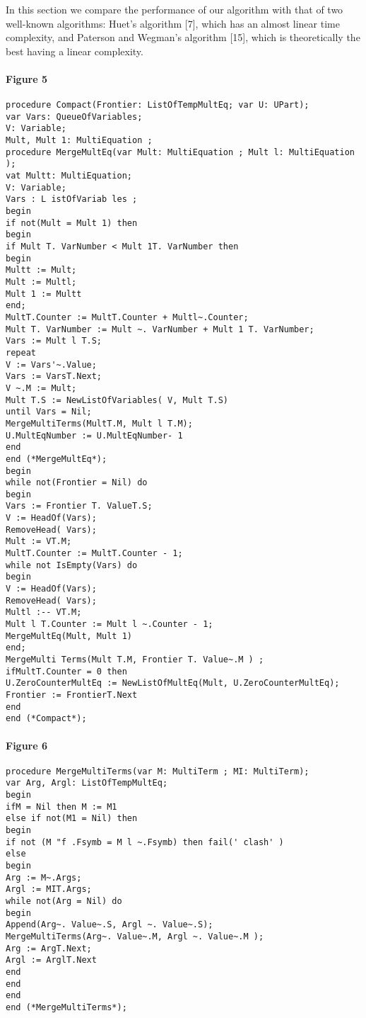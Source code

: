 \label{mmalg7}

In this section we compare the performance of our algorithm with that of two
well-known algorithms: Huet's algorithm [7], which has an almost linear time
complexity, and Paterson and Wegman's algorithm [15], which is theoretically
the best having a linear complexity.

\paragraph{Figure 5}
\begin{verbatim}
procedure Compact(Frontier: ListOfTempMultEq; var U: UPart);
var Vars: QueueOfVariables;
V: Variable;
Mult, Mult 1: MultiEquation ;
procedure MergeMultEq(var Mult: MultiEquation ; Mult l: MultiEquation );
vat Multt: MultiEquation;
V: Variable;
Vars : L istOfVariab les ;
begin
if not(Mult = Mult 1) then
begin
if Mult T. VarNumber < Mult 1T. VarNumber then
begin
Multt := Mult;
Mult := Multl;
Mult 1 := Multt
end;
MultT.Counter := MultT.Counter + Multl~.Counter;
Mult T. VarNumber := Mult ~. VarNumber + Mult 1 T. VarNumber;
Vars := Mult l T.S;
repeat
V := Vars'~.Value;
Vars := VarsT.Next;
V ~.M := Mult;
Mult T.S := NewListOfVariables( V, Mult T.S)
until Vars = Nil;
MergeMultiTerms(MultT.M, Mult l T.M);
U.MultEqNumber := U.MultEqNumber- 1
end
end (*MergeMultEq*);
begin
while not(Frontier = Nil) do
begin
Vars := Frontier T. ValueT.S;
V := HeadOf(Vars);
RemoveHead( Vars);
Mult := VT.M;
MultT.Counter := MultT.Counter - 1;
while not IsEmpty(Vars) do
begin
V := HeadOf(Vars);
RemoveHead( Vars);
Multl :-- VT.M;
Mult l T.Counter := Mult l ~.Counter - 1;
MergeMultEq(Mult, Mult 1)
end;
MergeMulti Terms(Mult T.M, Frontier T. Value~.M ) ;
ifMultT.Counter = 0 then
U.ZeroCounterMultEq := NewListOfMultEq(Mult, U.ZeroCounterMultEq);
Frontier := FrontierT.Next
end
end (*Compact*); 
\end{verbatim} 

\paragraph{Figure 6}
\begin{verbatim}
procedure MergeMultiTerms(var M: MultiTerm ; MI: MultiTerm);
var Arg, Argl: ListOfTempMultEq;
begin
ifM = Nil then M := M1
else if not(M1 = Nil) then
begin
if not (M "f .Fsymb = M l ~.Fsymb) then fail(' clash' )
else
begin
Arg := M~.Args;
Argl := MIT.Args;
while not(Arg = Nil) do
begin
Append(Arg~. Value~.S, Argl ~. Value~.S);
MergeMultiTerms(Arg~. Value~.M, Argl ~. Value~.M );
Arg := ArgT.Next;
Argl := ArglT.Next
end
end
end
end (*MergeMultiTerms*); 
\end{verbatim}

